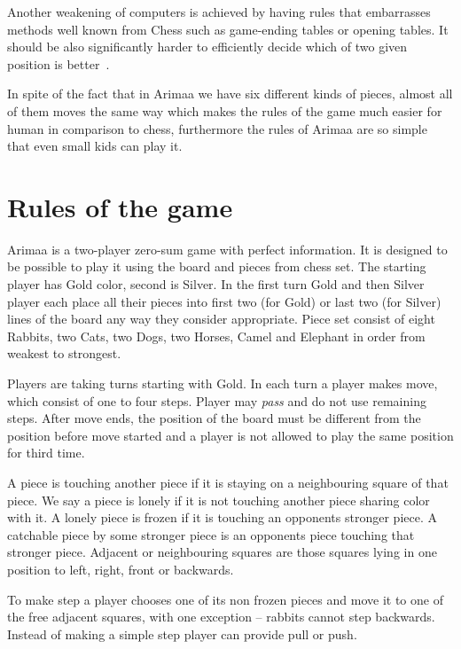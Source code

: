 Another weakening of computers is achieved by having rules that embarrasses
methods well known from Chess such as game-ending tables or opening tables.
It should be also significantly harder to efficiently decide which of two given
position is better~\cite{arimaa.com}.

In spite of the fact that in Arimaa we have six different kinds of pieces,
almost all of them moves the same way which makes the rules of the game much
easier for human in comparison to chess, furthermore the rules of Arimaa are so
simple that even small kids can play it.


\section{Rules of the game}
Arimaa is a two-player zero-sum game with perfect information. It is designed to
be possible to play it using the board and pieces from chess set. The starting
player has Gold color, second is Silver. In the first turn Gold and then
Silver player each place all their pieces into first two (for Gold) or last two
(for Silver) lines of the board any way they consider appropriate. Piece set
consist of eight Rabbits, two Cats, two Dogs, two Horses, Camel and Elephant in
order from weakest to strongest.


Players are taking turns starting with Gold. In each turn a player makes move,
which consist of one to four steps. Player may \emph{pass} and do not use
remaining steps. After move ends, the position of the board must be different
from the position before move started and a player is not allowed to play the
same position for third time.

A piece is touching another piece if it is staying on a neighbouring square of
that piece. We say a piece is lonely if it is not touching another piece
sharing color with it. A lonely piece is frozen if it is touching an opponents
stronger piece. A catchable piece by some stronger piece is an opponents piece
touching that stronger piece. Adjacent or neighbouring squares are those
squares lying in one position to left, right, front or backwards.


To make step a player chooses one of its non frozen pieces and move it to one of
the free adjacent squares, with one exception -- rabbits cannot step backwards.
Instead of making a simple step player can provide pull or push.

